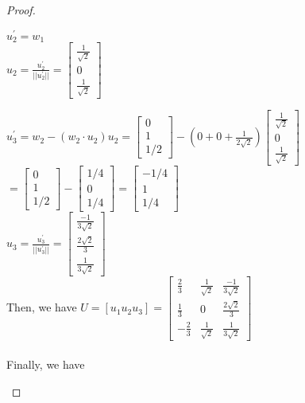 \documentclass[12pt]{article}
\begin{document}
\begin{proof}
\begin{enumerate}[label=(\alph*)]
$u_2^{'} =  w_1$ \\
$u_2 = \frac{u_2^{'}}{||u_2^{'}||} = \begin{bmatrix}
   \frac{1}{\sqrt{2}}\\ 0 \\ \frac{1}{\sqrt{2}}
\end{bmatrix} $

$u_3^{'} = w_2 - (w_2 \cdot u_2) u_2  = \begin{bmatrix}
   0 \\ 1 \\ 1/2
\end{bmatrix} - (0 + 0 + \frac{1}{2\sqrt{2}}) \begin{bmatrix}
   \frac{1}{\sqrt{2}}\\ 0 \\ \frac{1}{\sqrt{2}}
\end{bmatrix} $ \\
$ = \begin{bmatrix}
   0 \\ 1 \\ 1/2
\end{bmatrix} -  \begin{bmatrix}
   1/4 \\ 0 \\ 1/4 
\end{bmatrix}  = \begin{bmatrix}
   -1/4 \\ 1 \\ 1/4 
\end{bmatrix} $ \\
$u_3 = \frac{u_3^{'}}{||u_3^{'}||}  = \begin{bmatrix}
    \frac{-1}{3\sqrt{2}} \\ \frac{2\sqrt{2}}{3} \\ \frac{1}{3\sqrt{2}}
\end{bmatrix}$ \\

Then, we have $U = [u_1 u_2 u_3] = \begin{bmatrix}
    \frac{2}{3} & \frac{1}{\sqrt{2}} & \frac{-1}{3\sqrt{2}} \\
    \frac{1}{3} & 0 & \frac{2\sqrt{2}}{3} \\
    -\frac{2}{3} & \frac{1}{\sqrt{2}} & \frac{1}{3\sqrt{2}}
\end{bmatrix}$ \\
\\ 
Finally, we have \\


\end{enumerate}
\end{proof}
\end{document}
